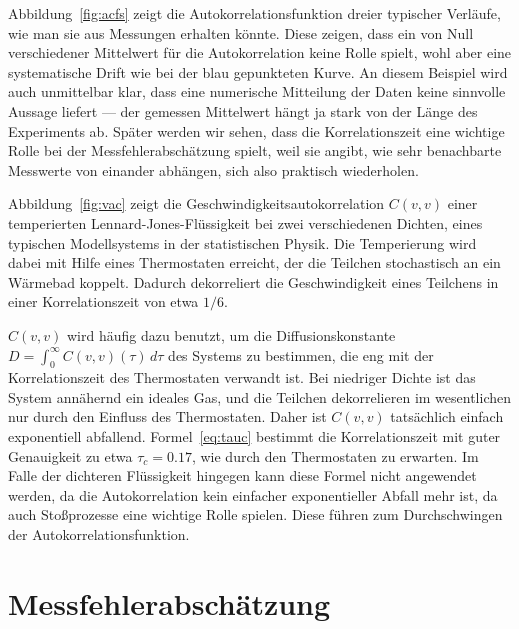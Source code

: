 Abbildung~\ref{fig:acfs} zeigt die Autokorrelationsfunktion dreier
typischer Verläufe, wie man sie aus Messungen erhalten könnte. Diese
zeigen, dass ein von Null verschiedener Mittelwert für die Autokorrelation
keine Rolle spielt, wohl aber eine systematische Drift wie bei der blau
gepunkteten Kurve. An diesem Beispiel wird auch unmittelbar klar, dass eine
numerische Mitteilung der Daten keine sinnvolle Aussage liefert --- der
gemessen Mittelwert hängt ja stark von der Länge des Experiments ab. Später
werden wir sehen, dass die Korrelationszeit eine wichtige Rolle bei der
Messfehlerabschätzung spielt, weil sie angibt, wie sehr benachbarte Messwerte
von einander abhängen, sich also praktisch wiederholen.

Abbildung~\ref{fig:vac} zeigt die Geschwindigkeitsautokorrelation
$C(v,v)$ einer temperierten Lennard-Jones-Flüs\-sig\-ke\-it bei zwei
verschiedenen Dichten, eines typischen Modellsystems in der
statistischen Physik. Die Temperierung wird dabei mit Hilfe eines
Thermostaten erreicht, der die Teilchen stochastisch an ein Wärmebad
koppelt. Dadurch dekorreliert die Geschwindigkeit eines Teilchens in
einer Korrelationszeit von etwa $1/6$.

$C(v,v)$ wird häufig dazu benutzt, um die Diffusionskonstante $D =
\int_0^{\infty} C(v,v)(\tau)\, d\tau$ des Systems zu bestimmen, die
eng mit der Korrelationszeit des Thermostaten verwandt ist.  Bei
niedriger Dichte ist das System annähernd ein ideales Gas, und die
Teilchen dekorrelieren im wesentlichen nur durch den Einfluss des
Thermostaten. Daher ist $C(v,v)$
tatsächlich einfach exponentiell abfallend.  Formel~\eqref{eq:tauc}
bestimmt die Korrelationszeit mit guter Genauigkeit zu etwa
$\tau_c=0.17$, wie durch den Thermostaten zu erwarten. Im Falle der
dichteren Flüssigkeit hingegen kann diese Formel nicht angewendet
werden, da die Autokorrelation kein einfacher exponentieller Abfall
mehr ist, da auch Stoßprozesse eine wichtige Rolle spielen. Diese
führen zum Durchschwingen der Autokorrelationsfunktion.

\section{Messfehlerabschätzung}

